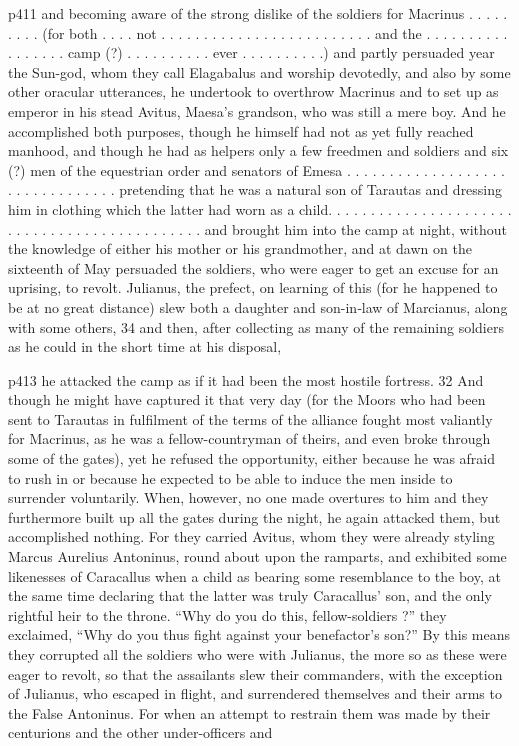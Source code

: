 p411 and becoming aware of the strong dislike of the soldiers for Macrinus . . . . . . . . . (for both . . . . not . . . . . . . . . . . . . . . . . . . . . . . . . and the . . . . . . . . . . . . . . . . . camp (?) . . . . . . . . . . ever . . . . . . . . . .) and partly persuaded year the Sun-god, whom they call Elagabalus and worship devotedly, and also by some other oracular utterances, he undertook to overthrow Macrinus and to set up as emperor in his stead Avitus, Maesa's grandson, who was still a mere boy. And he accomplished both purposes, though he himself had not as yet fully reached manhood, and though he had as helpers only a few freedmen and soldiers and six (?) men of the equestrian order and senators of Emesa . . . . . . . . . . . . . . . . . . . . . . . . . . . . . . . . pretending that he was a natural son of Tarautas and dressing him in clothing which the latter had worn as a child. . . . . . . . . . . . . . . . . . . . . . . . . . . . . . . . . . . . . . . . . . . . . and brought him into the camp at night, without the knowledge of either his mother or his grandmother, and at dawn on the sixteenth of May persuaded the soldiers, who were eager to get an excuse for an uprising, to revolt. Julianus, the prefect, on learning of this (for he happened to be at no great distance) slew both a daughter and son-in\texthebrew{‑}law of Marcianus, along with some others, 34
and then, after collecting as many of the remaining soldiers as he could in the short time at his disposal,

p413 he attacked the camp as if it had been the most hostile fortress. 32
And though he might have captured it that very day (for the Moors who had been sent to Tarautas in fulfilment of the terms of the alliance fought most valiantly for Macrinus, as he was a fellow-countryman of theirs, and even broke through some of the gates), yet he refused the opportunity, either because he was afraid to rush in or because he expected to be able to induce the men inside to surrender voluntarily. When, however, no one made overtures to him and they furthermore built up all the gates during the night, he again attacked them, but accomplished nothing. For they carried Avitus, whom they were already styling Marcus Aurelius Antoninus, round about upon the ramparts, and exhibited some likenesses of Caracallus when a child as bearing some resemblance to the boy, at the same time declaring that the latter was truly Caracallus' son, and the only rightful heir to the throne. ``Why do you do this, fellow-soldiers ?'' they exclaimed, ``Why do you thus fight against your benefactor's son?'' By this means they corrupted all the soldiers who were with Julianus, the more so as these were eager to revolt, so that the assailants slew their commanders, with the exception of Julianus, who escaped in flight, and surrendered themselves and their arms to the False Antoninus. For when an attempt to restrain them was made by their centurions and the other under-officers and


